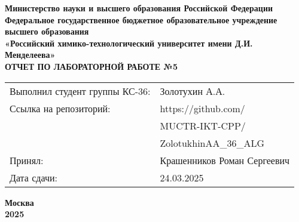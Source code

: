 \documentclass[12pt, a4paper]{report}
\begin{document}
	\begin{titlepage}
		\begin{center}
			\large \textbf{Министерство науки и высшего образования Российской Федерации} \\
			\large \textbf{Федеральное государственное бюджетное образовательное учреждение высшего образования} \\
			\large \textbf{«Российский химико-технологический университет имени Д.И. Менделеева»} \\

			\vspace*{4cm}
			\LARGE \textbf{ОТЧЕТ ПО ЛАБОРАТОРНОЙ РАБОТЕ №5}

			\vspace*{4cm}
			\begin{flushright}
				\Large
				\begin{tabular}{>{\raggedleft\arraybackslash}p{9cm} p{10cm}}
					Выполнил студент группы КС-36: & Золотухин А.А. \\
					Ссылка на репозиторий: & https://github.com/ \\
					& MUCTR-IKT-CPP/ \\
					& ZolotukhinAA\_36\_ALG \\
					Принял: & Крашенников Роман Сергеевич \\
					Дата сдачи: & 24.03.2025 \\
				\end{tabular}
			\end{flushright}

			\vspace*{6cm}
			\Large \textbf{Москва \\ 2025}
		\end{center}
	\end{titlepage}

	\tableofcontents
	\thispagestyle{empty}
	\newpage

\end{document}
